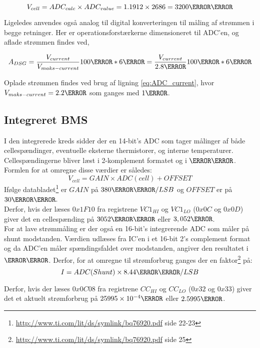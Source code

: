 \begin {equation}
V_{cell} = ADC_{calc} \times ADC_{value} = 1.1912 \times 2686 = 3200\milli\volt 
\label{eq:V_cell}
\end {equation}

Ligeledes anvendes også analog til digital konverteringen til måling af strømmen i begge retninger. Her er operationsforstærkerne dimensioneret til ADC'en, og aflade strømmen findes ved,

\begin {equation}
A_{DSG} =  \frac{V_{current}}{V_{maks-current}} 100\percent * 6\ampere =  \frac{V_{current}}{2.8\volt} 100\percent * 6\ampere \label{eq:ADC_current}
\end {equation}

Oplade strømmen findes ved brug af ligning \ref{eq:ADC_current}, hvor $V_{maks-current} = 2.2\volt$ som ganges med $1\ampere$.

\subsection{Integreret BMS}
I den integrerede kreds sidder der en 14-bit's ADC som tager målinger af både cellespændinger, eventuelle eksterne thermistorer, og interne temperaturer. Cellespændingerne bliver læst i 2-komplement formatet og i $\milli\volt$. Formlen for at omregne disse værdier er således: 
\begin {equation} 
V_{cell} = GAIN \times ADC(cell) + OFFSET
\end {equation}
Ifølge databladet\footnote{\url{http://www.ti.com/lit/ds/symlink/bq76920.pdf} side 22-23} er $GAIN$ på $380\micro\volt/LSB$ og $OFFSET$ er på $30\milli\volt$. \\

Derfor, hvis der læses $0x1F10$ fra registrene $VC1_{HI}$ og $VC1_{LO}$ ($0x0C$ og $0x0D$) giver det en cellespænding på $3052\milli\volt$ eller $3,052\volt$.\\

For at lave strømmåling er der også en 16-bit's integrerende ADC som måler på shunt modstanden. Værdien udlæses fra IC'en i et 16-bit 2's complement format og da ADC'en måler spændingsfaldet over modstanden, angiver den resultatet i $\micro\volt$. Derfor, for at omregne til strømforbrug ganges der en faktor\footnote{\url{http://www.ti.com/lit/ds/symlink/bq76920.pdf} side 25} på: 
\begin {equation} 
I = ADC(Shunt) \times 8.44\micro\volt/LSB
\end {equation}

Derfor, hvis der læses $0x0C08$ fra registrene $CC_{HI}$ og $CC_{LO}$ ($0x32$ og $0x33$) giver det et aktuelt strømforbrug på $25995\times10^{-4}\ampere$ eller $2.5995\ampere$.